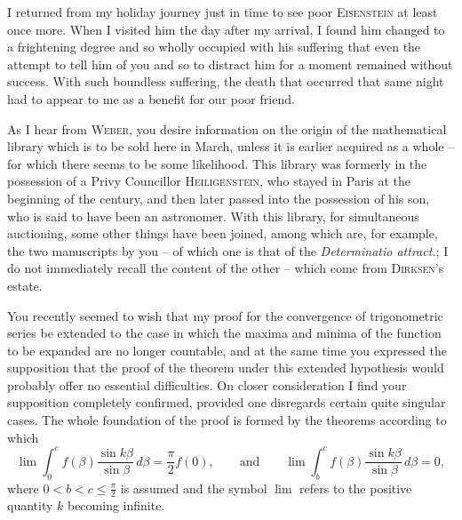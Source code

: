 \documentclass[11pt]{article}
\newcommand{\scn}[1]{\textsc{#1}}
\begin{document}
I returned from my holiday journey just in time to see poor \scn{Eisenstein} at least once more. When I visited him the day after my arrival, I found him changed to a frightening degree and so wholly occupied with his suffering that even the attempt to tell him of you and so to distract him for a moment remained without success. With such boundless suffering, the death that occurred that same night had to appear to me as a benefit for our poor friend.

As I hear from \scn{Weber}, you desire information on the origin of the mathematical library which is to be sold here in March, unless it is earlier acquired as a whole -- for which there seems to be some likelihood. This library was formerly in the possession of a Privy Councillor \scn{Heiligenstein}, who stayed in Paris at the beginning of the century, and then later passed into the possession of his son, who is said to have been an astronomer. With this library, for simultaneous auctioning, some other things have been joined, among which are, for example, the two manuscripts by you -- of which one is that of the \emph{Determinatio attract.}; I do not immediately recall the content of the other -- which come from \scn{Dirksen}'s estate.

You recently seemed to wish that my proof for the convergence of trigonometric series be extended to the case in which the maxima and minima of the function to be expanded are no longer countable, and at the same time you expressed the supposition that the proof of the theorem under this extended hypothesis would probably offer no essential difficulties. On closer consideration I find your supposition completely confirmed, provided one disregards certain quite singular cases. The whole foundation of the proof is formed by the theorems according to which
\[
 \lim \int_0^c f(\beta)\frac{\sin k\beta}{\sin\beta}\,d\beta=\frac{\pi}{2}f(0),
 \qquad\text{and}\qquad
 \lim \int_b^c f(\beta)\frac{\sin k\beta}{\sin\beta}\,d\beta=0,
\]
where $0<b<c\leq\frac\pi2$ is assumed and the symbol $\lim$ refers to the positive quantity $k$ becoming infinite.
\end{document}
